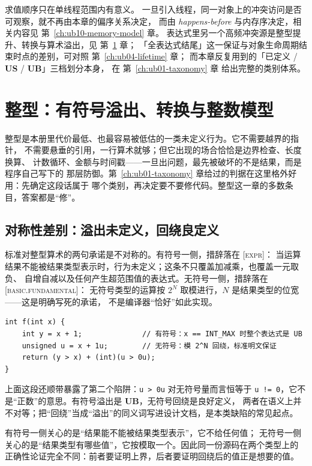 \documentclass[12pt,a4paper,fontset=fandol]{ctexbook}
\newcommand{\Tp}[1]{\texttt{#1}}
\newcommand{\UB}{\textbf{\textsf{UB}}}
\newcommand{\USB}{\textbf{\textsf{US}}}
\newcommand{\Std}[1]{\textsc{[#1]}}
\begin{document}
求值顺序只在单线程范围内有意义。
一旦引入线程，同一对象上的冲突访问是否可观察，就不再由本章的偏序关系决定，
而由 \emph{happens-before} 与内存序决定，相关内容见 第~\ref{ch:ub10-memory-model} 章。
表达式里另一个高频冲突源是整型提升、转换与算术溢出，见 第~\ref{ch:ub09-integers} 章；
「全表达式结尾」这一保证与对象生命周期结束时点的差别，可对照 第~\ref{ch:ub04-lifetime} 章；
而本章反复用到的「已定义 / \USB{} / \UB{}」三档划分本身，
在 第~\ref{ch:ub01-taxonomy} 章 给出完整的类别体系。

\chapter{整型：有符号溢出、转换与整数模型}\label{ch:ub09-integers}

整型是本册里代价最低、也最容易被低估的一类未定义行为。它不需要越界的指针，
不需要悬垂的引用，一行算术就够；但它出现的场合恰恰是边界检查、长度换算、
计数循环、金额与时间戳——一旦出问题，最先被破坏的不是结果，而是程序自己写下的
那层防御。第~\ref{ch:ub01-taxonomy} 章给过的判据在这里格外好用：先确定这段话属于
哪个类别，再决定要不要修代码。整型这一章的多数条目，答案都是“修”。

\section{对称性差别：溢出未定义，回绕良定义}\label{sec:ub09-symmetry}

标准对整型算术的两句承诺是不对称的。有符号一侧，措辞落在 \Std{expr}：
当运算结果不能被结果类型表示时，行为未定义；这条不只覆盖加减乘，也覆盖一元取负、
自增自减以及任何产生超范围值的表达式。无符号一侧，措辞落在 \Std{basic.fundamental}：
无符号类型的运算按 $2^N$ 取模进行，$N$ 是结果类型的位宽——这是明确写死的承诺，
不是编译器“恰好”如此实现。

\begin{lstlisting}[style=cppstyle, caption={同一行代码的两种命运：有符号溢出与无符号回绕}]
int f(int x) {
    int y = x + 1;              // 有符号：x == INT_MAX 时整个表达式是 UB
    unsigned u = x + 1u;        // 无符号：模 2^N 回绕，标准明文保证
    return (y > x) + (int)(u > 0u);
}
\end{lstlisting}

上面这段还顺带暴露了第二个陷阱：\Tp{u > 0u} 对无符号量而言恒等于
\Tp{u != 0}，它不是“正数”的意思。有符号溢出是 \UB{}，无符号回绕是良好定义，
两者在语义上并不对等；把“回绕”当成“溢出”的同义词写进设计文档，是本类缺陷的常见起点。

\begin{clause}[title={标准怎么说：一句关于结果，一句关于类型}]
有符号一侧关心的是“结果能不能被结果类型表示”，它不给任何值；
无符号一侧关心的是“结果类型有哪些值”，它按模取一个。因此同一份源码在两个类型上的
正确性论证完全不同：前者要证明上界，后者要证明回绕后的值正是想要的值。
\end{clause}
\end{document}
